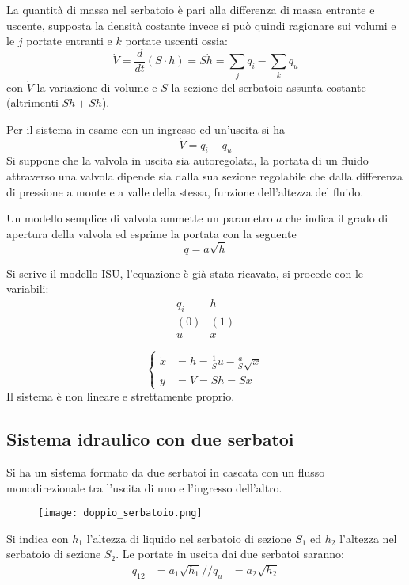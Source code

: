 La quantità di massa nel serbatoio è pari alla differenza di massa entrante e
uscente, supposta la densità costante invece si può quindi ragionare sui volumi
e le $j$ portate entranti e $k$ portate uscenti ossia:
$$
\dot{V} = \frac{d}{dt}(S\cdot h) = S\dot{h} = \sum_j q_i - \sum_k q_u
$$
con $\dot{V}$ la variazione di volume e $S$ la sezione del serbatoio
assunta costante (altrimenti $S\dot h + \dot{S}h$).

Per il sistema in esame con un ingresso ed un'uscita si ha
$$
\dot{V} = q_i - q_u
$$
Si suppone che la valvola in uscita sia autoregolata, la portata di un fluido
attraverso una valvola dipende sia dalla sua sezione regolabile che dalla
differenza di pressione a monte e a valle della stessa, funzione dell'altezza
del fluido.

Un modello semplice di valvola ammette un parametro $a$ che
indica il grado di apertura della valvola ed esprime la portata con la
seguente
$$
q = a\sqrt{h}
$$

Si scrive il modello ISU, l'equazione è già stata ricavata, si procede con le
variabili:
$$
\begin{matrix}
q_i & h \\
(0) & (1) \\
u & x
\end{matrix}
$$

$$\left\{\begin{aligned}
\dot{x} &= \dot{h} = \frac{1}{S} u - \frac{a}{S}\sqrt{x} \\
y &= V = Sh = Sx
\end{aligned}\right.$$
Il sistema è non lineare e strettamente proprio.

\subsection{Sistema idraulico con due serbatoi}
Si ha un sistema formato da due serbatoi in cascata con un flusso
monodirezionale tra l'uscita di uno e l'ingresso dell'altro.
\begin{figure}[h]
 \centering
 \texttt{[image: doppio\_serbatoio.png]}
 \label{Fig.:doppio_serbatoio}
\end{figure}

Si indica con $h_1$ l'altezza di liquido nel serbatoio di sezione $S_1$ ed
$h_2$ l'altezza nel serbatoio di sezione $S_2$. Le portate in uscita dai due
serbatoi saranno:
$$\begin{aligned}
q_{12} &= a_1\sqrt{h_1} //
q_u &= a_2\sqrt{h_2}
\end{aligned}$$

